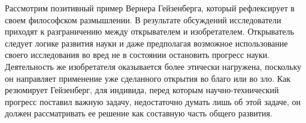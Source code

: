 Рассмотрим позитивный пример Вернера Гейзенберга, который рефлексирует в своем философском
размышлении. В результате обсуждений исследователи приходят к разграничению
между открывателем и изобретателем. Открыватель следует логике развития науки и
даже предполагая возможное использование своего исследования во вред не в
состоянии остановить прогресс науки. Деятельность же изобретателя оказывается более 
этически нагружена, поскольку он направляет применение уже сделанного открытия во благо или во зло.
Как резюмирует Гейзенберг, для индивида, перед которым научно-технический прогресс поставил важную задачу, недостаточно думать лишь об этой
задаче, он должен рассматривать ее решение как составную часть общего развития.

